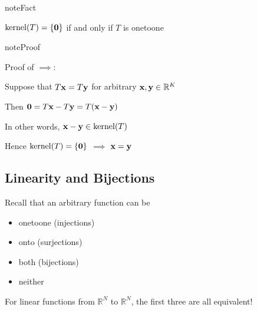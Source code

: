 \documentclass[letterpaper,10pt,english]{jupyterBook}
\begin{document}
\begin{sphinxadmonition}{note}{Fact}

\sphinxAtStartPar
\(\mathrm{kernel}(T) = \{{\bf 0}\}\) if and only if \(T\) is one\sphinxhyphen{}to\sphinxhyphen{}one
\end{sphinxadmonition}

\begin{sphinxadmonition}{note}{Proof}

\sphinxAtStartPar
Proof of \(\implies\):

\sphinxAtStartPar
Suppose that \(T{\bf x} = T{\bf y}\) for arbitrary \({\bf x}, {\bf y} \in \mathbb{R}^K\)

\sphinxAtStartPar
Then \({\bf 0} = T{\bf x} - T{\bf y} = T({\bf x} - {\bf y})\)

\sphinxAtStartPar
In other words, \({\bf x} - {\bf y} \in \mathrm{kernel}(T)\)

\sphinxAtStartPar
Hence \(\mathrm{kernel}(T) = \{{\bf 0}\}\) \(\implies\) \({\bf x} = {\bf y}\)
\end{sphinxadmonition}


\subsection{Linearity and Bijections}
\label{\detokenize{05.linear_algebra:linearity-and-bijections}}
\sphinxAtStartPar
Recall that an arbitrary function can be
\begin{itemize}
\item {} 
\sphinxAtStartPar
one\sphinxhyphen{}to\sphinxhyphen{}one (injections)

\item {} 
\sphinxAtStartPar
onto (surjections)

\item {} 
\sphinxAtStartPar
both (bijections)

\item {} 
\sphinxAtStartPar
neither

\end{itemize}

\sphinxAtStartPar
For linear functions from \(\mathbb{R}^N\) to \(\mathbb{R}^N\), the first three are all
equivalent!
\end{document}
